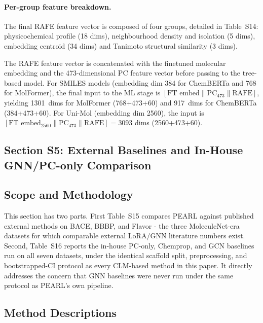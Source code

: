 \documentclass[9pt,a4paper]{article}
\begin{document}
\paragraph{Per-group feature breakdown.}
The final RAFE feature vector is composed of four groups, detailed in Table~S14: physicochemical profile (18 dims), neighbourhood density and isolation (5 dims), embedding centroid (34 dims) and Tanimoto structural similarity (3 dims).

The RAFE feature vector is concatenated with the finetuned molecular embedding and the 473-dimensional PC feature vector before passing to the tree-based model.
For SMILES models (embedding dim 384 for ChemBERTa and 768 for MolFormer), the final input to the ML stage is
$[\text{FT embed} \| \text{PC}_{473} \| \text{RAFE}]$, yielding 1301~dims for
MolFormer (768+473+60) and 917~dims for ChemBERTa (384+473+60).
For Uni-Mol (embedding dim 2560), the input is
$[\text{FT embed}_{2560} \| \text{PC}_{473} \| \text{RAFE}] = 3093$ dims (2560+473+60).

\subsection*{Section S5: External Baselines and In-House GNN/PC-only Comparison}

\subsection*{Scope and Methodology}

This section has two parts. First Table~S15
compares PEARL against published external methods on BACE, BBBP, and Flavor - the
three MoleculeNet-era datasets for which comparable external LoRA/GNN literature
numbers exist. Second, Table~S16 reports the
in-house PC-only, Chemprop, and GCN baselines run on all seven datasets, under
the identical scaffold split, preprocessing, and bootstrapped-CI protocol as every
CLM-based method in this paper. It directly addresses the concern that GNN baselines were never run
under the same protocol as PEARL's own pipeline.

\subsection*{Method Descriptions}
\end{document}
